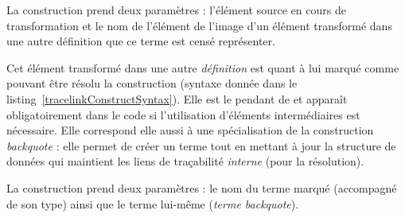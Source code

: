 %    

La construction  prend deux paramètres : l'élément source en
cours de transformation et le nom de l'élément de l'image d'un élément
transformé dans une autre définition que ce terme est censé représenter.

Cet élément transformé dans une autre \emph{définition} est quant à lui marqué
comme pouvant être résolu {\via} la construction  (syntaxe
donnée dans le listing~\ref{tracelinkConstructSyntax}). Elle est le pendant de
 et apparaît obligatoirement dans le code si l'utilisation
d'éléments intermédiaires est nécessaire. Elle correspond elle aussi à une
spécialisation de la construction \emph{backquote} : elle permet de créer un
terme tout en mettant à jour la structure de données qui maintient les liens de
traçabilité \emph{interne} (pour la résolution).


La construction  prend deux paramètres : le nom du terme
marqué (accompagné de son type) ainsi que le terme lui-même (\emph{terme
backquote}). 

%

